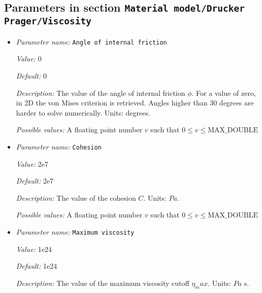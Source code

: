\subsection{Parameters in section \tt Material model/Drucker Prager/Viscosity}
\label{parameters:Material_20model/Drucker_20Prager/Viscosity}

\begin{itemize}
\item {\it Parameter name:} {\tt Angle of internal friction}
\label{parameters:Material model/Drucker Prager/Viscosity/Angle of internal friction}
\label{parameters:Material_20model/Drucker_20Prager/Viscosity/Angle_20of_20internal_20friction}


{\it Value:} 0


{\it Default:} 0


{\it Description:} The value of the angle of internal friction $\phi$. For a value of zero, in 2D the von Mises criterion is retrieved. Angles higher than 30 degrees are harder to solve numerically. Units: degrees.


{\it Possible values:} A floating point number $v$ such that $0 \leq v \leq \text{MAX\_DOUBLE}$
\item {\it Parameter name:} {\tt Cohesion}
\label{parameters:Material model/Drucker Prager/Viscosity/Cohesion}
\label{parameters:Material_20model/Drucker_20Prager/Viscosity/Cohesion}


{\it Value:} 2e7


{\it Default:} 2e7


{\it Description:} The value of the cohesion $C$. Units: $Pa$.


{\it Possible values:} A floating point number $v$ such that $0 \leq v \leq \text{MAX\_DOUBLE}$
\item {\it Parameter name:} {\tt Maximum viscosity}
\label{parameters:Material model/Drucker Prager/Viscosity/Maximum viscosity}
\label{parameters:Material_20model/Drucker_20Prager/Viscosity/Maximum_20viscosity}


{\it Value:} 1e24


{\it Default:} 1e24


{\it Description:} The value of the maximum viscosity cutoff $\eta_max$. Units: $Pa\;s$.



\end{itemize}
